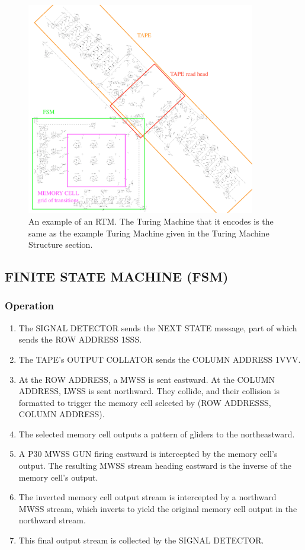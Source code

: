 \documentclass{article}
\begin{document}
\begin{figure}[h]
\centering
\includegraphics[width=10cm,keepaspectratio]{images/RTM.png}
\captionsetup{labelformat=empty} \caption{An example of an RTM. The Turing Machine that it encodes is the same as the example Turing Machine given in the Turing Machine Structure section.}
\end{figure}
\subsection{FINITE STATE MACHINE (FSM)}\subsubsection{Operation}

\begin{enumerate}
\item The SIGNAL DETECTOR sends the NEXT STATE message, part of which sends the ROW ADDRESS 1SSS.


\item The TAPE's OUTPUT COLLATOR sends the COLUMN ADDRESS 1VVV.


\item At the ROW ADDRESS, a MWSS is sent eastward. At the COLUMN ADDRESS, LWSS is sent northward. They collide, and their collision is formatted to trigger the memory cell selected by (ROW ADDRESSS, COLUMN ADDRESS).


\item The selected memory cell outputs a pattern of gliders to the northeastward.


\item A P30 MWSS GUN firing eastward is intercepted by the memory cell's output. The resulting MWSS stream heading eastward is the inverse of the memory cell's output.


\item The inverted memory cell output stream is intercepted by a northward MWSS stream, which inverts to yield the original memory cell output in the northward stream.


\item This final output stream is collected by the SIGNAL DETECTOR.

\end{enumerate}
\end{document}
